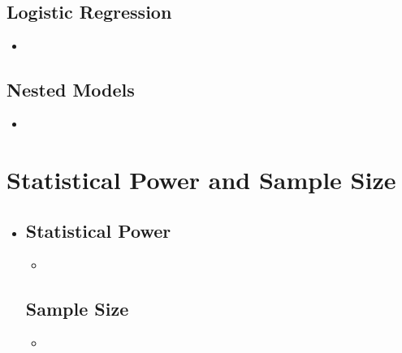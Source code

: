 \begin{itemize}
  \subsection{Logistic Regression}
  \begin{itemize}
    \item 
  \end{itemize}

  \subsection{Nested Models}
  \begin{itemize}
    \item 
  \end{itemize}
  
\end{itemize}

\section{Statistical Power and Sample Size}
\begin{itemize}
  \item []
  
  \subsection{Statistical Power}
  \begin{itemize}
    \item 
  \end{itemize}

  \subsection{Sample Size}
  \begin{itemize}
    \item 
  \end{itemize}
  
\end{itemize}

